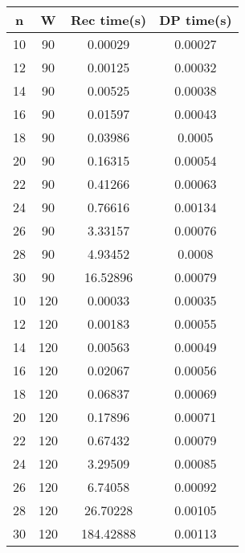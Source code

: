 \documentclass{article}
\begin{document}
\begin{multicols}{3}
        \begin{tabular}{||c c c c||} 
        \hline
        n & W & Rec time(s) & DP time(s) \\ [0.5ex] 
        \hline\hline
        10 & 90 & 0.00029 & 0.00027 \\
        \hline
        12 & 90 & 0.00125 & 0.00032 \\
        \hline
        14 & 90 & 0.00525 & 0.00038 \\
        \hline
        16 & 90 & 0.01597 & 0.00043 \\
        \hline
        18 & 90 & 0.03986 & 0.0005 \\
        \hline
        20 & 90 & 0.16315 & 0.00054 \\
        \hline
        22 & 90 & 0.41266 & 0.00063 \\
        \hline
        24 & 90 & 0.76616 & 0.00134 \\
        \hline
        26 & 90 & 3.33157 & 0.00076 \\
        \hline
        28 & 90 & 4.93452 & 0.0008 \\
        \hline
        30 & 90 & 16.52896 & 0.00079 \\
        \hline\hline
        10 & 120 & 0.00033 & 0.00035 \\
        \hline
        12 & 120 & 0.00183 & 0.00055 \\
        \hline
        14 & 120 & 0.00563 & 0.00049 \\
        \hline
        16 & 120 & 0.02067 & 0.00056 \\
        \hline
        18 & 120 & 0.06837 & 0.00069 \\
        \hline
        20 & 120 & 0.17896 & 0.00071 \\
        \hline
        22 & 120 & 0.67432 & 0.00079 \\
        \hline
        24 & 120 & 3.29509 & 0.00085 \\
        \hline
        26 & 120 & 6.74058 & 0.00092 \\
        \hline
        28 & 120 & 26.70228 & 0.00105 \\
        \hline
        30 & 120 & 184.42888 & 0.00113\\
        \hline
        \end{tabular}

\end{multicols}
    
\subsubsection*{}
\end{document}
